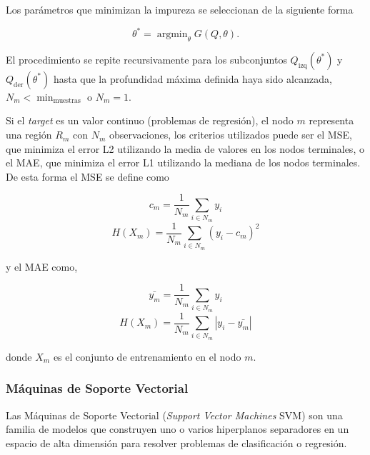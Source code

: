 \documentclass[spanish]{article}
\begin{document}
          
          Los parámetros que minimizan la impureza se seleccionan de la siguiente forma
          
          \begin{equation}
            \theta^* = \operatorname{argmin}_\theta  G(Q, \theta).
          \end{equation}
         
          El procedimiento se repite recursivamente para los subconjuntos $Q_{\text{izq}}(\theta^*)$ y 
          $Q_{\text{der}}(\theta^*)$ hasta que la profundidad máxima definida haya sido alcanzada, 
          $N_m < \min_{\text{muestras}}$ o $N_m = 1$. \medskip
          
          Si el \emph{target} es un valor continuo (problemas de regresión), el nodo $m$ representa 
          una región $R_m$ con $N_m$ observaciones, los criterios utilizados puede ser el MSE, que minimiza 
          el error L2 utilizando la media de valores en los nodos terminales, o el MAE, que minimiza el 
          error L1 utilizando la mediana de los nodos terminales. De esta forma el MSE se define como
      
          \begin{equation}
            c_m = \frac{1}{N_m} \sum_{i \in N_m} y_i
          \end{equation}
          \begin{equation}
            H(X_m) = \frac{1}{N_m} \sum_{i \in N_m} (y_i - c_m)^2
          \end{equation}
          
          y el MAE como,
          
          \begin{equation}
            \bar{y_m} = \frac{1}{N_m} \sum_{i \in N_m} y_i
          \end{equation}
          \begin{equation}
            H(X_m) = \frac{1}{N_m} \sum_{i \in N_m} |y_i - \bar{y_m}|
          \end{equation}
          
          donde $X_m$ es el conjunto de entrenamiento en el nodo $m$.
                            
        \subsubsection{Máquinas de Soporte Vectorial}
        
          Las Máquinas de Soporte Vectorial (\emph{Support Vector Machines} SVM) \cite{Cortes1995} son una familia de modelos 
          que construyen uno o varios hiperplanos separadores en un espacio de alta dimensión para resolver 
          problemas de clasificación o regresión. \medskip
          
\end{document}
